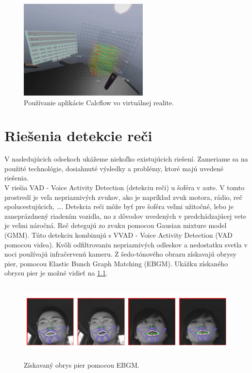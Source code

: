 \begin{figure}[H]
	\begin{center}
		\includegraphics[height=5cm]{pics/calcFlow.jpg}
		\caption{Používanie aplikácie Calcflow vo virtuálnej realite. 
		 \cite{calcFlow}}
		\label{pic-calcFlow}
	\end{center}
\end{figure}

\chapter{Riešenia detekcie reči}
V nasledujúcich odsekoch ukážeme niekoľko existujúcich riešení.
Zameriame sa na použité technológie, dosiahnuté výsledky a problémy, ktoré majú uvedené riešenia.\\

V \cite{aoki2007voice} riešia VAD - Voice Activity Detection (detekciu reči) u šoféra v aute.
V tomto prostredí je veľa nepriaznivých zvukov, ako je napríklad zvuk motora, rádio, reč spolucestujúcich, \ldots. 
Detekcia reči môže byť pre šoféra veľmi užitočné, lebo je zaneprázdnený riadením vozidla, no z dôvodov uvedených v predchádzajúcej vete je veľmi náročná.
Reč detegujú zo zvuku pomocou Gausian mixture model (GMM).
Túto detekciu kombinujú s VVAD - Voice Activity Detection (VAD pomocou videa).
Kvôli odfiltrovaniu nepriaznivých odleskov a nedostatku svetla v noci používajú infračervenú kameru.
Z šedo-tónového obrazu získavajú obrysy pier, pomocou Elastic Bunch Graph Matching (EBGM).
Ukážku získaného obrysu pier je možné vidieť na \ref{pic-EBGM}. 

\begin{figure}[H]
	\begin{center}
		\includegraphics[height=4cm]{pics/EBGM.png}
		\caption{Získavaný obrys pier pomocou EBGM.
		 \cite{aoki2007voice}}
		\label{pic-EBGM}
	\end{center}
\end{figure}

